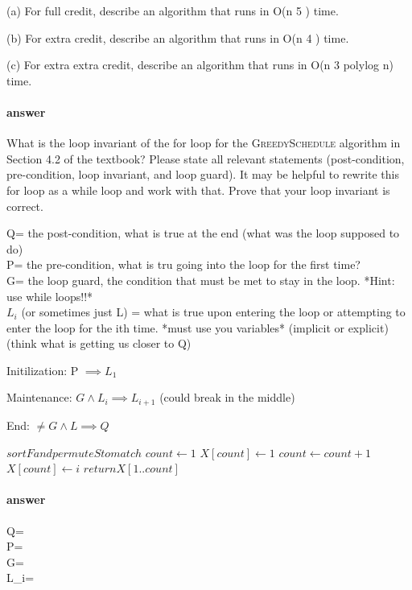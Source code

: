 \documentclass{article}
\begin{document}
(a) For full credit, describe an algorithm that runs in O(n 5 ) time.

(b) For extra credit, describe an algorithm that runs in O(n 4 ) time.

(c) For extra extra credit, describe an algorithm that runs in O(n 3 polylog n)
time.

\paragraph{answer}

\todo{}

\collab{}

What is the loop invariant of the for loop for the \textsc{GreedySchedule}
algorithm in Section 4.2 of the textbook?  Please state all relevant statements
(post-condition, pre-condition, loop invariant, and loop guard).  It may be
helpful to rewrite this for loop as a while loop and work with that.  Prove that
your loop invariant is correct.

Q= the post-condition, what is true at the end (what was the loop supposed to do) \\
P= the pre-condition, what is tru going into the loop for the first time? \\
G= the loop guard, the condition that must be met to stay in the loop. *Hint: use while loops!!* \\
$L_{i}$ (or sometimes just L) = what is true upon entering the loop or attempting to enter the loop for the ith time. *must use you variables* (implicit or explicit) (think what is getting us closer to Q)

Initilization: P $\implies L_{1}$

Maintenance: $G \wedge L_{i} \implies L_{i+1}$ (could break in the middle)

End: $\neq G \wedge L \implies Q$

\begin{algorithmic}[1]
    \State$ sort F and permute S to match$
    \State$ count ← 1$
    \State$ X [count] ← 1$
            \State$ count ← count + 1$
            \State$ X [count] ← i$
        \EndIf{}
    \EndFor{}
    \State$ return X [1 .. count]$
\end{algorithmic}

\paragraph{answer}

Q= \\
P= \\
G= \\
L_{i}=

\todo{}
\end{document}
